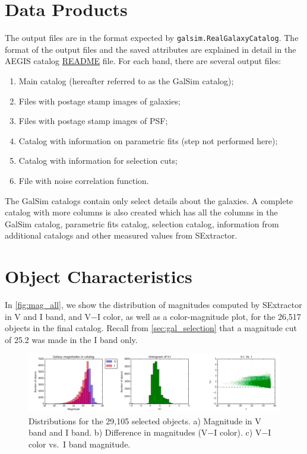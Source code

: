 \documentclass[a4paper,11pt]{article}
\begin{document}
\section{Data Products}
\label{sec:data}
The output files are in the format expected by {\tt galsim.RealGalaxyCatalog}. The format of the output files and the saved attributes are explained in detail in the AEGIS catalog  \href{https://github.com/sowmyakth/true_gal_colors/blob/master/AEGIS_25.2_training_sample_readme.txt}{README} file. 
For each band, there are several output files:
\begin{enumerate}
\item Main catalog (hereafter referred to as the GalSim catalog);
\item Files with postage stamp images of galaxies;
\item Files with postage stamp images of PSF;
\item Catalog with information on parametric fits (step not performed here);
\item Catalog with information for selection cuts;
\item File with noise correlation function.
\end{enumerate}

The GalSim catalogs contain only select details about the galaxies. A complete catalog with more columns is also created which has all the columns in the GalSim catalog, parametric fits catalog, selection catalog, information from additional catalogs and other measured values from SExtractor. 

\section{Object Characteristics}
\label{sec:analysis} 
In \autoref{fig:mag_all}, we show the distribution of magnitudes computed by SExtractor in V and I band, and V$-$I color, as well as a color-magnitude plot, for the 26,517 objects in the final catalog. 
Recall from \autoref{sec:gal_selection} that a magnitude cut of 25.2 was made in the I band only.
\begin{figure}[h]
\centering\includegraphics[width=1.\linewidth]{AEGIS_magnitude.png}
\caption{Distributions for the 29,105 selected objects. a) Magnitude in V band and I band. b) Difference in magnitudes (V$-$I color).  c) V$-$I color vs.~I band magnitude.}
\label{fig:mag_all}
\end{figure}
\end{document}
